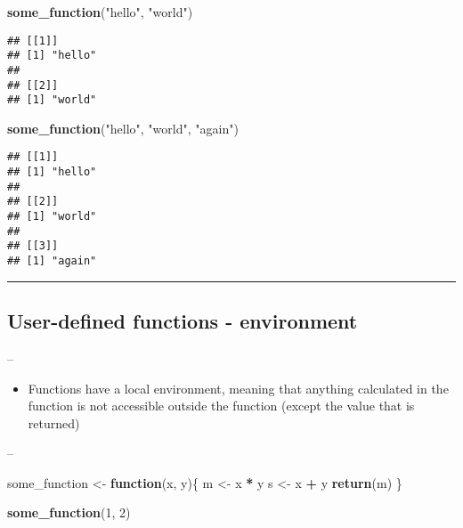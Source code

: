 \documentclass[]{article}
\newenvironment{Shaded}{\begin{snugshade}}{\end{snugshade}}
\newcommand{\ControlFlowTok}[1]{\textcolor[rgb]{0.13,0.29,0.53}{\textbf{#1}}}
\newcommand{\DecValTok}[1]{\textcolor[rgb]{0.00,0.00,0.81}{#1}}
\newcommand{\KeywordTok}[1]{\textcolor[rgb]{0.13,0.29,0.53}{\textbf{#1}}}
\newcommand{\NormalTok}[1]{#1}
\newcommand{\OperatorTok}[1]{\textcolor[rgb]{0.81,0.36,0.00}{\textbf{#1}}}
\newcommand{\StringTok}[1]{\textcolor[rgb]{0.31,0.60,0.02}{#1}}
\providecommand{\tightlist}{%
  \setlength{\itemsep}{0pt}\setlength{\parskip}{0pt}}
\begin{document}
\begin{Shaded}
\begin{Highlighting}[]
\KeywordTok{some_function}\NormalTok{(}\StringTok{"hello"}\NormalTok{, }\StringTok{"world"}\NormalTok{)}
\end{Highlighting}
\end{Shaded}

\begin{verbatim}
## [[1]]
## [1] "hello"
## 
## [[2]]
## [1] "world"
\end{verbatim}

\begin{Shaded}
\begin{Highlighting}[]
\KeywordTok{some_function}\NormalTok{(}\StringTok{"hello"}\NormalTok{, }\StringTok{"world"}\NormalTok{, }\StringTok{"again"}\NormalTok{)}
\end{Highlighting}
\end{Shaded}

\begin{verbatim}
## [[1]]
## [1] "hello"
## 
## [[2]]
## [1] "world"
## 
## [[3]]
## [1] "again"
\end{verbatim}

\begin{center}\rule{0.5\linewidth}{\linethickness}\end{center}

\hypertarget{user-defined-functions---environment}{%
\subsection{User-defined functions -
environment}\label{user-defined-functions---environment}}

--

\begin{itemize}
\tightlist
\item
  Functions have a local environment, meaning that anything calculated
  in the function is not accessible outside the function (except the
  value that is returned)
\end{itemize}

--

\begin{Shaded}
\begin{Highlighting}[]
\NormalTok{some_function <-}\StringTok{ }\ControlFlowTok{function}\NormalTok{(x, y)\{}
\NormalTok{  m <-}\StringTok{ }\NormalTok{x }\OperatorTok{*}\StringTok{ }\NormalTok{y}
\NormalTok{  s <-}\StringTok{ }\NormalTok{x }\OperatorTok{+}\StringTok{ }\NormalTok{y}
  \KeywordTok{return}\NormalTok{(m)}
\NormalTok{\}}

\KeywordTok{some_function}\NormalTok{(}\DecValTok{1}\NormalTok{, }\DecValTok{2}\NormalTok{)}
\end{Highlighting}
\end{Shaded}
\end{document}

